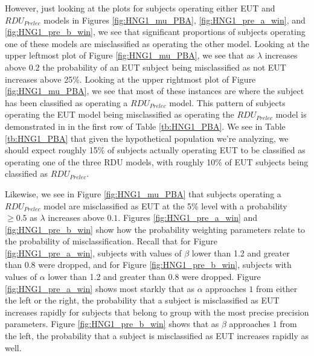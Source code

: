 \documentclass[../main.tex]{subfiles}
\begin{document}
However, just looking at the plots for subjects operating either EUT and $\mathit{RDU_{Prelec}}$ models in Figures \ref{fig:HNG1_mu_PBA}, \ref{fig:HNG1_pre_a_win}, and \ref{fig:HNG1_pre_b_win}, we see that significant proportions of subjects operating one of these models are misclassified as operating the other model.
Looking at the upper leftmost plot of Figure \ref{fig:HNG1_mu_PBA}, we see that as $\lambda$ increases above $0.2$ the probability of an EUT subject being misclassified as not EUT increases above 25\%.
Looking at the upper rightmost plot of Figure \ref{fig:HNG1_mu_PBA}, we see that most of these instances are where the subject has been classified as operating a $\mathit{RDU_{Prelec}}$ model.
This pattern of subjects operating the EUT model being misclassified as operating the $\mathit{RDU_{Prelec}}$ model is demonstrated in in the first row of Table \ref{tb:HNG1_PBA}.
We see in Table \ref{tb:HNG1_PBA} that given the hypothetical population we're analyzing, we should expect roughly 15\% of subjects actually operating EUT to be classified as operating one of the three RDU models, with roughly 10\% of EUT subjects being classified as $\mathit{RDU_{Prelec}}$.

Likewise, we see in Figure \ref{fig:HNG1_mu_PBA} that subjects operating a $\mathit{RDU_{Prelec}}$ model are misclassified as EUT at the 5\% level with a probability $\geq 0.5$ as $\lambda$ increases above $0.1$.
Figures \ref{fig:HNG1_pre_a_win} and \ref{fig:HNG1_pre_b_win} show how the probability weighting parameters relate to the probability of misclassification.
Recall that for Figure \ref{fig:HNG1_pre_a_win}, subjects with values of $\beta$ lower than 1.2 and greater than 0.8 were dropped, and for Figure \ref{fig:HNG1_pre_b_win}, subjects with values of $\alpha$ lower than 1.2 and greater than 0.8 were dropped.
Figure \ref{fig:HNG1_pre_a_win} shows most starkly that as $\alpha$ approaches $1$ from either the left or the right, the probability that a subject is misclassified as EUT increases rapidly for subjects that belong to group with the most precise precision parameters.
Figure \ref{fig:HNG1_pre_b_win} shows that as $\beta$ approaches $1$ from the left, the probability that a subject is misclassified as EUT increases rapidly as well.
\end{document}
